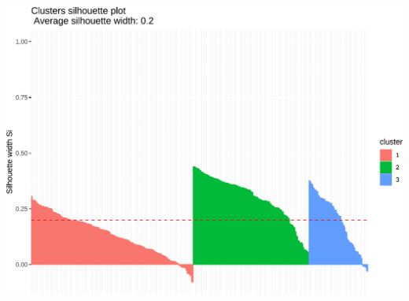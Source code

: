 \documentclass[
  12pt,
  letterpaper,
]{article}
\begin{document}
\includegraphics[width=0.8\linewidth,height=6in]{tesis_ver_final_files/figure-latex/anexo-d-1}

\newpage
\end{document}

